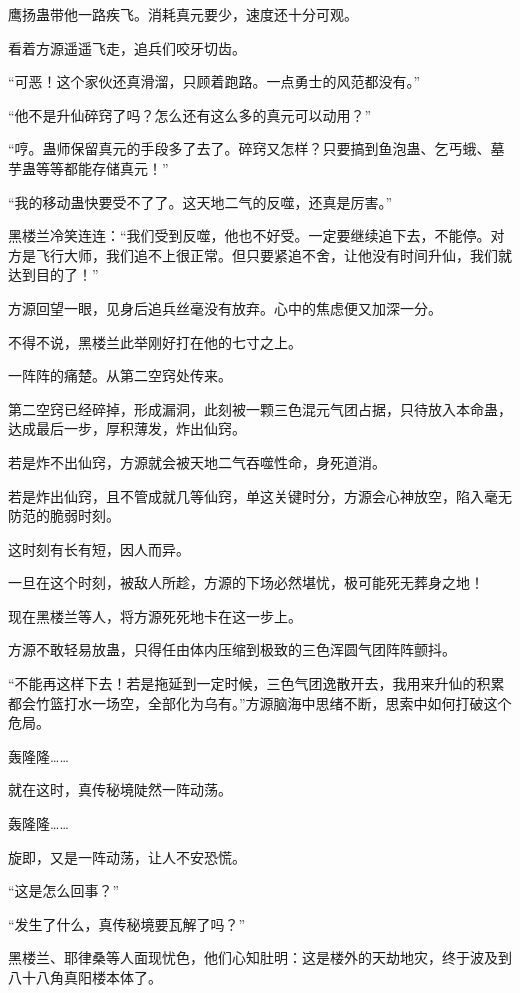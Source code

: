 \begin{this_body}
鹰扬蛊带他一路疾飞。消耗真元要少，速度还十分可观。

看着方源遥遥飞走，追兵们咬牙切齿。

“可恶！这个家伙还真滑溜，只顾着跑路。一点勇士的风范都没有。”

“他不是升仙碎窍了吗？怎么还有这么多的真元可以动用？”

“哼。蛊师保留真元的手段多了去了。碎窍又怎样？只要搞到鱼泡蛊、乞丐蛾、墓芋蛊等等都能存储真元！”

“我的移动蛊快要受不了了。这天地二气的反噬，还真是厉害。”

黑楼兰冷笑连连：“我们受到反噬，他也不好受。一定要继续追下去，不能停。对方是飞行大师，我们追不上很正常。但只要紧追不舍，让他没有时间升仙，我们就达到目的了！”

方源回望一眼，见身后追兵丝毫没有放弃。心中的焦虑便又加深一分。

不得不说，黑楼兰此举刚好打在他的七寸之上。

一阵阵的痛楚。从第二空窍处传来。

第二空窍已经碎掉，形成漏洞，此刻被一颗三色混元气团占据，只待放入本命蛊，达成最后一步，厚积薄发，炸出仙窍。

若是炸不出仙窍，方源就会被天地二气吞噬性命，身死道消。

若是炸出仙窍，且不管成就几等仙窍，单这关键时分，方源会心神放空，陷入毫无防范的脆弱时刻。

这时刻有长有短，因人而异。

一旦在这个时刻，被敌人所趁，方源的下场必然堪忧，极可能死无葬身之地！

现在黑楼兰等人，将方源死死地卡在这一步上。

方源不敢轻易放蛊，只得任由体内压缩到极致的三色浑圆气团阵阵颤抖。

“不能再这样下去！若是拖延到一定时候，三色气团逸散开去，我用来升仙的积累都会竹篮打水一场空，全部化为乌有。”方源脑海中思绪不断，思索中如何打破这个危局。

轰隆隆……

就在这时，真传秘境陡然一阵动荡。

轰隆隆……

旋即，又是一阵动荡，让人不安恐慌。

“这是怎么回事？”

“发生了什么，真传秘境要瓦解了吗？”

黑楼兰、耶律桑等人面现忧色，他们心知肚明：这是楼外的天劫地灾，终于波及到八十八角真阳楼本体了。


\end{this_body}

